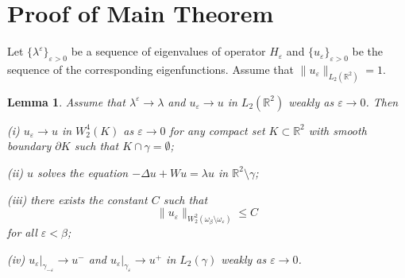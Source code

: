 \documentclass[reqno]{amsart}
\theoremstyle{plain}
\newtheorem{lem}{Lemma}
\numberwithin{equation}{section}
\newcommand{\Real}{\mathbb R}
\newcommand{\eps}{\varepsilon}
\renewcommand{\leq}{\leqslant}
\begin{document}
\vskip60pt

\section{Proof of Main Theorem}
Let $\{\lambda^\eps\}_{\eps>0}$ be a sequence of eigenvalues of operator $H_\eps$ and $\{u_\eps\}_{\eps>0}$ be the sequence of the corresponding eigenfunctions.
Assume that $\|u_\eps\|_{L_2(\Real^2)}=1$.

\begin{lem}
  Assume that $\lambda^\eps\to \lambda$ and $u_\eps\to u$ in $L_2(\Real^2)$ weakly as $\eps\to 0$. Then 
  
  (i) $u_\eps\to u$ in $W_2^4(K)$ as $\eps\to 0$ for any compact set $K\subset \Real^2$ with smooth boundary $\partial K$ such that $K\cap\gamma=\emptyset$;
  
  (ii) 
  $u$ solves the equation $-\Delta u+Wu=\lambda u$ in $\Real^2\setminus \gamma$;
  
  (iii) there exists the constant $C$ such that
 \begin{equation}\label{UepsW22OmegaEps}
   \|u_\eps\|_{W_2^2(\omega_\beta\setminus\omega_\eps)}\leq C
 \end{equation}
for all $\eps<\beta$; 

 (iv) $u_\eps|_{\gamma_{-\eps}}\to u^-$ and  $u_\eps|_{\gamma_{\eps}}\to u^+$ in $L_2(\gamma)$ weakly as $\eps\to 0$.
\end{lem}
\end{document}
